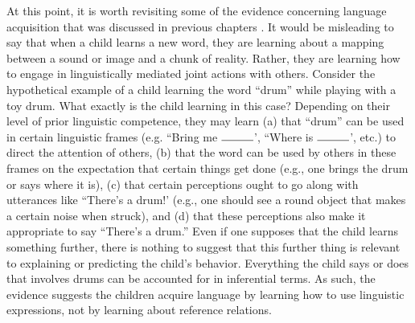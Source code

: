 At this point, it is worth revisiting some of the evidence concerning language acquisition that was discussed in previous chapters \citep[e.g.][]{Miller:2006,Bloom:2001,Tomasello:2001,Tomasello:2005}. It would be misleading to say that when a child learns a new word, they are learning about a mapping between a sound or image and a chunk of reality. Rather, they are learning how to engage in linguistically mediated joint actions with others. Consider the hypothetical example of a child learning the word ``drum'' while playing with a toy drum. What exactly is the child learning in this case? Depending on their level of prior linguistic competence, they may learn (a) that ``drum'' can be used in certain linguistic frames (e.g. ``Bring me $\rule{1cm}{0.15mm}$', ``Where is $\rule{1cm}{0.15mm}$', etc.) to direct the attention of others, (b) that the word can be used by others in these frames on the expectation that certain things get done (e.g., one brings the drum or says where it is), (c) that certain perceptions ought to go along with utterances like ``There's a drum!' (e.g., one should see a round object that makes a certain noise when struck), and (d) that these perceptions also make it appropriate to say ``There's a drum.'' Even if one supposes that the child learns something further, there is nothing to suggest that this further thing is relevant to explaining or predicting the child's behavior. Everything the child says or does that involves drums can be accounted for in inferential terms. As such, the evidence suggests the children acquire language by learning how to use linguistic expressions, not by learning about reference relations.

